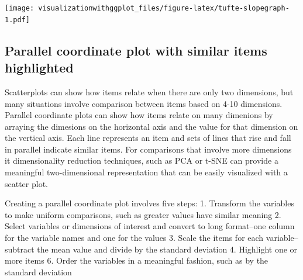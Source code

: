 \documentclass[]{krantz}
\begin{document}
\texttt{[image: visualizationwithggplot\_files/figure-latex/tufte-slopegraph-1.pdf]}

\hypertarget{parallel-coordinate-plot-with-similar-items-highlighted}{%
\subsection{Parallel coordinate plot with similar items highlighted}\label{parallel-coordinate-plot-with-similar-items-highlighted}}

Scatterplots can show how items relate when there are only two dimensions, but many situations involve comparison between items based on 4-10 dimensions. Parallel coordinate plots can show how items relate on many dimenions by arraying the dimesions on the horizontal axis and the value for that dimension on the vertical axis. Each line represents an item and sets of lines that rise and fall in parallel indicate similar items. For comparisons that involve more dimensions it dimensionality reduction techniques, such as PCA or t-SNE can provide a meaningful two-dimensional representation that can be easily visualized with a scatter plot.

Creating a parallel coordinate plot involves five steps:
1. Transform the variables to make uniform comparisons, such as greater values have similar meaning
2. Select variables or dimensions of interest and convert to long format--one column for the variable names and one for the values
3. Scale the items for each variable--subtract the mean value and divide by the standard deviation
4. Highlight one or more items
6. Order the variables in a meaningful fashion, such as by the standard deviation
\end{document}
